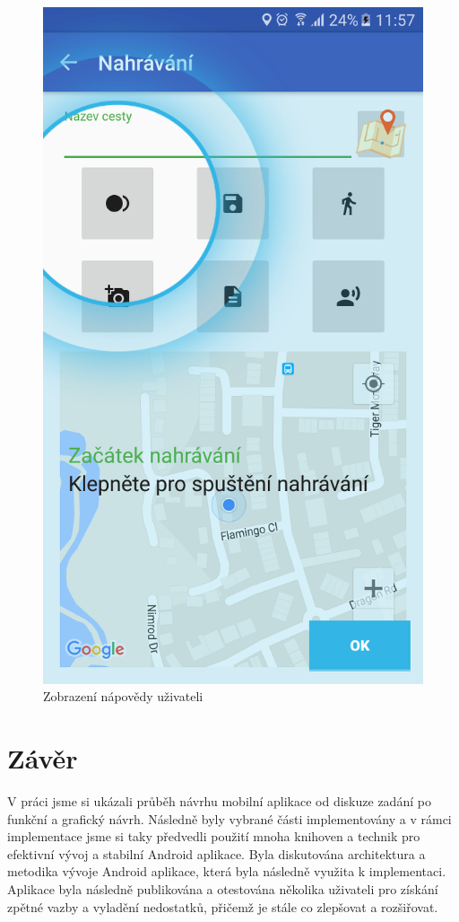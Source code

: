 \documentclass[czech,master,public,dept460,male,java,cpdeclaration]{diploma}
\begin{document}
  \begin{figure}[H]
            \centering
                    \includegraphics[scale=0.14]{img/screen/nahravaninapoveda.png}
            \caption{Zobrazení nápovědy uživateli}
            \label{fig:nahravaninapoveda}
    \end{figure}



\section{Závěr}
V práci jsme si ukázali průběh návrhu mobilní aplikace od diskuze zadání po funkční a grafický návrh.
Následně byly vybrané části implementovány a v rámci implementace jsme si taky předvedli použití mnoha knihoven a technik
pro efektivní vývoj a stabilní Android aplikace. Byla diskutována architektura a metodika vývoje Android aplikace,
která byla následně využita k implementaci. Aplikace byla následně publikována a otestována několika uživateli pro
 získání zpětné vazby a vyladění nedostatků, přičemž je stále co zlepšovat a rozšiřovat.
\end{document}
